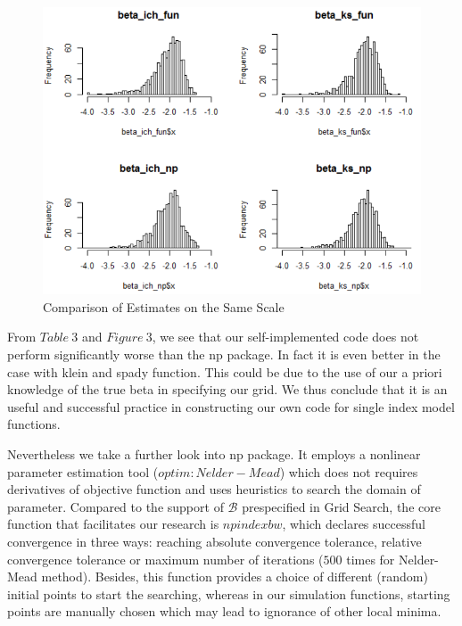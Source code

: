 \documentclass[a4paper]{article}
\begin{document}
\begin{figure}[h!]
  \caption{Comparison of Estimates on the Same Scale}
  \includegraphics[width=\linewidth]{compare_done.png}
 
  \label{fig:comparison of estimates on the same scale}
\end{figure}

From $Table\ 3$ and $Figure\ 3$, we see that our self-implemented code does not perform significantly worse than the np package. In fact it is even better in the case with klein and spady function. This could be due to the use of our a priori knowledge of the true beta in specifying our grid. We thus conclude that it is an useful and successful practice in constructing our own code for single index model functions.

Nevertheless we take a further look into np package. It employs a nonlinear parameter estimation tool ($optim: Nelder-Mead$) which does not requires derivatives of objective function and uses heuristics to search the domain of parameter. Compared to the support of $\mathcal{B}$ prespecified in Grid Search, the core function that facilitates our research is $npindexbw$, which declares successful convergence in three ways: reaching absolute convergence tolerance, relative convergence tolerance or maximum number of iterations ($500$ times for Nelder-Mead method). Besides, this function provides a choice of different (random) initial points to start the searching, whereas in our simulation functions, starting points are manually chosen which may lead to ignorance of other local minima.
\end{document}
